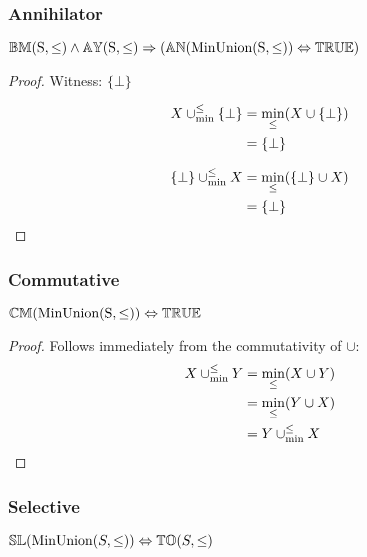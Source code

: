 \documentclass[../Summary.tex]{subfiles}
\begin{document}
\subsubsection{Annihilator}

\begin{theorem} \label{thm:minunion_an}
${\mathbb{BM}}(\mathrm{S,\leq}) \wedge {\mathbb{AY}}(\mathrm{S,\leq}) \Rightarrow ({\mathbb{AN}}(\mathrm{MinUnion(S,\leq)}) \Leftrightarrow {\mathbb{TRUE}})$
\end{theorem}


\begin{proof}
Witness: $\{\bot\}$

\begin{align*}
X \mathbin{\cup_{\min}^{\leq}} \{\bot\} 	& = \min_\leq(X \cup \{\bot\}) \\
						& = \{\bot\}
\end{align*}

\begin{align*}
\{\bot\} \mathbin{\cup_{\min}^{\leq}} X 	& = \min_\leq(\{\bot\} \cup X) \\
						& = \{\bot\}
\end{align*}
\end{proof}




\subsubsection{Commutative}

\begin{theorem} \label{thm:minunion_cm}
${\mathbb{CM}}(\mathrm{MinUnion(S,\leq)}) \Leftrightarrow {\mathbb{TRUE}}$
\end{theorem}

\begin{proof}
Follows immediately from the commutativity of $\cup$:
\begin{align*}
X \mathbin{\cup_{\min}^{\leq}} Y 	& = \min_\leq(X \cup Y) \\
				& = \min_\leq(Y \cup X) \\
				& = Y \mathbin{\cup_{\min}^{\leq}} X
\end{align*}
\end{proof}




\subsubsection{Selective}

\begin{theorem} \label{thm:minunion_sl}
${\mathbb{SL}}(\mathrm{MinUnion}(S,\leq)) \Leftrightarrow {\mathbb{TO}}(S,\leq)$
\end{theorem}
\end{document}
